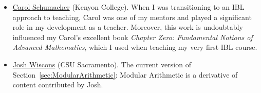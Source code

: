 \begin{itemize}
\item \href{http://www2.kenyon.edu/Depts/Math/schumacherc/public_html/}{Carol Schumacher} (Kenyon College). When I was transitioning to an IBL approach to teaching, Carol was one of my mentors and played a significant role in my development as a teacher.  Moreover, this work is undoubtably influenced my Carol's excellent book \emph{Chapter Zero: Fundamental Notions of Advanced Mathematics}, which I used when teaching my very first IBL course.
\item \href{http://webpages.csus.edu/wiscons/}{Josh Wiscons} (CSU Sacramento). The current version of Section~\ref{sec:ModularArithmetic}: Modular Arithmetic is a derivative of content contributed by Josh.
\end{itemize}

